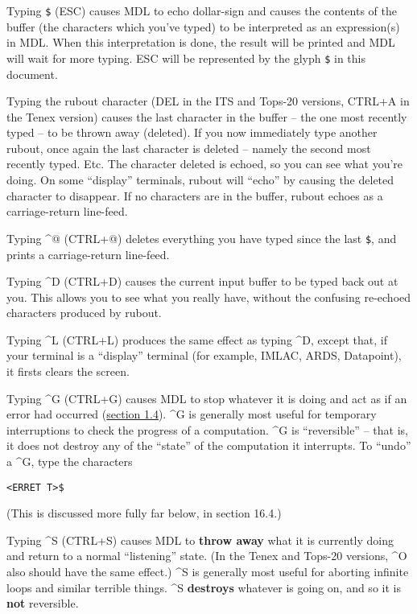 \documentclass[a4paper]{scrbook}
\begin{document}
Typing \texttt{\$} (ESC) causes MDL to echo dollar-sign and causes the contents of the buffer (the characters which you've
typed) to be interpreted as an expression(s) in MDL. When this interpretation is done, the result will be printed and MDL
will wait for more typing. ESC will be represented by the glyph \texttt{\$} in this document.

Typing the rubout  character (DEL in the ITS  and Tops-20
 versions, CTRL+A in the Tenex  version) causes the last character in the
buffer -- the one most recently typed -- to be thrown away (deleted). If you now immediately type another rubout, once
again the last character is deleted -- namely the second most recently typed. Etc. The character deleted is echoed, so you
can see what you're doing. On some ``display'' terminals, rubout will ``echo'' by causing the deleted character to
disappear. If no characters are in the buffer, rubout echoes as a carriage-return line-feed.

Typing \^{}@  (CTRL+@) deletes everything you have typed since the last \texttt{\$}, and
prints a carriage-return line-feed.

Typing \^{}D  (CTRL+D) causes the current input buffer to be typed back out at you. This
allows you to see what you really have, without the confusing re-echoed characters produced by rubout.

Typing \^{}L  (CTRL+L) produces the same effect as typing \^{}D, except that, if your
terminal is a ``display'' terminal (for example, IMLAC, ARDS, Datapoint), it firsts clears the screen.

Typing \^{}G  (CTRL+G) causes MDL to stop whatever it is doing and act as if an error had
occurred (\protect\hyperlink{14-errors-simple-considerations-1}{section 1.4}). \^{}G is generally most useful for temporary
interruptions to check the progress of a computation. \^{}G is ``reversible'' -- that is, it does not destroy any of the
``state'' of the computation it interrupts. To ``undo'' a \^{}G, type the characters

\begin{verbatim}
<ERRET T>$
\end{verbatim}

(This is discussed more fully far below, in section 16.4.)

Typing \^{}S  (CTRL+S) causes MDL to \textbf{throw away} what it is currently doing and
return to a normal ``listening'' state. (In the Tenex and Tops-20 versions, \^{}O  also
should have the same effect.) \^{}S is generally most useful for aborting infinite loops and similar terrible things. \^{}S
\textbf{destroys} whatever is going on, and so it is \textbf{not} reversible.
\end{document}
